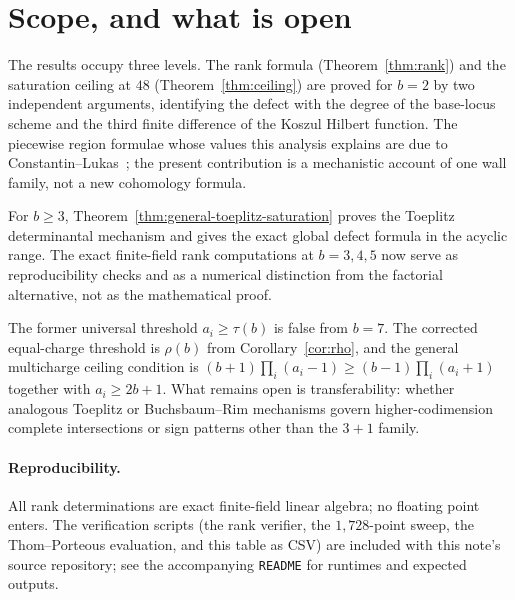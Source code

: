 \documentclass[11pt]{article}
\theoremstyle{plain}
\theoremstyle{definition}
\theoremstyle{remark}
\begin{document}
\section{Scope, and what is open}\label{sec:open}

The results occupy three levels. The rank formula (Theorem~\ref{thm:rank}) and the saturation ceiling at $48$ (Theorem~\ref{thm:ceiling}) are proved for $b=2$ by two independent arguments, identifying the defect with the degree of the base-locus scheme and the third finite difference of the Koszul Hilbert function. The piecewise region formulae whose values this analysis explains are due to Constantin--Lukas~\cite{ConstantinLukas2019}; the present contribution is a mechanistic account of one wall family, not a new cohomology formula.

For $b\ge3$, Theorem~\ref{thm:general-toeplitz-saturation} proves the Toeplitz determinantal mechanism and gives the exact global defect formula in the acyclic range. The exact finite-field rank computations at $b=3,4,5$ now serve as reproducibility checks and as a numerical distinction from the factorial alternative, not as the mathematical proof.

The former universal threshold $a_i\ge\tau(b)$ is false from $b=7$. The corrected equal-charge threshold is $\rho(b)$ from Corollary~\ref{cor:rho}, and the general multicharge ceiling condition is $(b+1)\prod_i(a_i-1)\ge(b-1)\prod_i(a_i+1)$ together with $a_i\ge2b+1$. What remains open is transferability: whether analogous Toeplitz or Buchsbaum--Rim mechanisms govern higher-codimension complete intersections or sign patterns other than the $3{+}1$ family.

\paragraph{Reproducibility.} All rank determinations are exact finite-field linear algebra; no floating point enters. The verification scripts (the rank verifier, the $1{,}728$-point sweep, the Thom--Porteous evaluation, and this table as CSV) are included with this note's source repository; see the accompanying \texttt{README} for runtimes and expected outputs.
\end{document}
